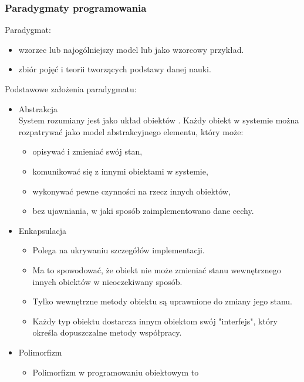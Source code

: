\documentclass[a4paper]{article}
\begin{document}
\subsubsection{Paradygmaty programowania}

Paradygmat:
\begin{itemize}
    \item wzorzec lub najogólniejszy
model lub jako wzorcowy przykład.
    \item zbiór pojęć i teorii tworzących podstawy danej nauki.
\end{itemize}


Podstawowe założenia paradygmatu:
    \begin{itemize}
        \item Abstrakcja\\
        System rozumiany jest jako układ obiektów . Każdy
        obiekt w systemie można rozpatrywać jako model
        abstrakcyjnego elementu, który może:
        \begin{itemize}
            \item opisywać i zmieniać swój stan,
            \item komunikować się z innymi obiektami w systemie,
            \item wykonywać pewne czynności na rzecz innych obiektów,
            \item bez ujawniania, w jaki sposób zaimplementowano
        dane cechy.
        \end{itemize}
        \item Enkapsulacja\\
        \begin{itemize}
            \item Polega na ukrywaniu szczegółów implementacji.
            \item Ma to spowodować, że obiekt nie może zmieniać
            stanu wewnętrznego innych obiektów w
            nieoczekiwany sposób.
            \item Tylko wewnętrzne metody obiektu są uprawnione
            do zmiany jego stanu.
            \item Każdy typ obiektu dostarcza innym obiektom swój
            "interfejs", który określa dopuszczalne metody współpracy.
        \end{itemize}
        \item Polimorfizm\\
        \begin{itemize}
            \item Polimorfizm w programowaniu obiektowym to

\end{itemize}
\end{itemize}
\end{document}
